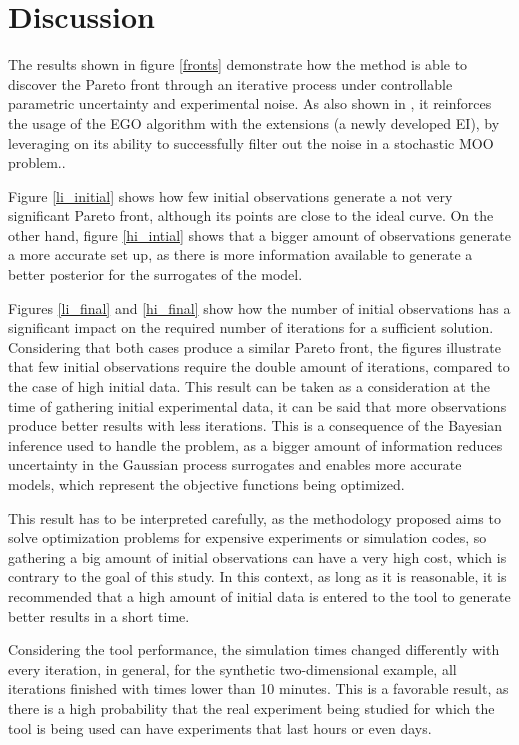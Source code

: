 \documentclass{article}
\begin{document}
\section{Discussion}

The results shown in figure \ref{fronts} demonstrate how the method is able to discover the Pareto front through an iterative process under controllable parametric uncertainty and experimental noise. As also shown in \cite{Huang2006}, it reinforces the usage of the EGO algorithm with the extensions (a newly developed EI\cite{Jones1998}), by leveraging on its ability to successfully filter out the noise in a stochastic MOO problem..

Figure \ref{li_initial} shows how few initial observations generate a not very significant Pareto front, although its points are close to the ideal curve. On the other hand, figure \ref{hi_intial} shows that a bigger amount of observations generate a more accurate set up, as there is more information available to generate a better posterior for the surrogates of the model.

Figures \ref{li_final} and \ref{hi_final} show how the number of initial observations has a significant impact on the required number of iterations for a sufficient solution. Considering that both cases produce a similar Pareto front, the figures illustrate that few initial observations require the double amount of iterations, compared to the case of high initial data. This result can be taken as a consideration at the time of gathering initial experimental data, it can be said that more observations produce better results with less iterations. This is a consequence of the Bayesian inference used to handle the problem, as a bigger amount of information reduces uncertainty in the Gaussian process surrogates and enables more accurate models, which represent the objective functions being optimized.

This result has to be interpreted carefully, as the methodology proposed aims to solve optimization problems for expensive experiments or simulation codes, so gathering a big amount of initial observations can have a very high cost, which is contrary to the goal of this study. In this context, as long as it is reasonable, it is recommended that a high amount of initial data is entered to the tool to generate better results in a short time.

Considering the tool performance, the simulation times changed differently with every iteration, in general, for the synthetic two-dimensional example, all iterations finished with times lower than 10 minutes. This is a favorable result, as there is a high probability that the real experiment being studied for which the tool is being used can have experiments that last hours or even days.
\end{document}
